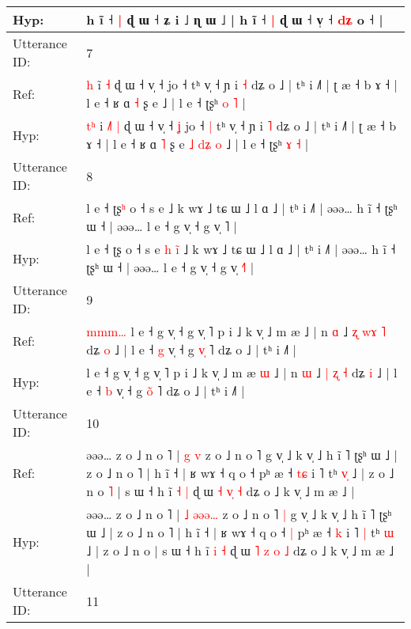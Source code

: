\documentclass[10pt]{article}
\DeclareRobustCommand{\hl}[1]{{\textcolor{red}{#1}}}
\begin{document}
\begin{longtable}{ll}
 \\
Hyp: & h ĩ ˧\hl{ }\hl{|} ɖ ɯ ˧ ʑ i ˩ ɳ ɯ ˩ | h ĩ ˧\hl{ }\hl{|} ɖ ɯ ˧ v̩ ˧ \hl{d}\hl{ʑ}\hl{ }o ˧ |
 \\
\midrule
Utterance ID: & 7 \\
Ref: & \hl{}\hl{h} i\hl{}\hl{}\hl{̃} \hl{˧} ɖ ɯ ˧ v̩ ˧\hl{}\hl{} jo ˧\hl{}\hl{} tʰ v̩ ˧ ɲ i \hl{˧} dʑ o ˩ | tʰ i ˩˥ | ʈ æ ˧ b ɤ ˧ | l e ˧ ʁ ɑ \hl{˧} ʂ e\hl{}\hl{}\hl{}\hl{}\hl{}\hl{}\hl{} ˩ | l e ˧ ʈʂʰ \hl{o} \hl{˥} |
 \\
Hyp: & \hl{t}\hl{ʰ} i\hl{ }\hl{˩}\hl{˥} \hl{|} ɖ ɯ ˧ v̩ ˧\hl{ }\hl{ʝ} jo ˧\hl{ }\hl{|} tʰ v̩ ˧ ɲ i \hl{˥} dʑ o ˩ | tʰ i ˩˥ | ʈ æ ˧ b ɤ ˧ | l e ˧ ʁ ɑ \hl{˥} ʂ e\hl{ }\hl{˩}\hl{ }\hl{d}\hl{ʑ}\hl{ }\hl{o} ˩ | l e ˧ ʈʂʰ \hl{ɤ} \hl{˧} |
 \\
\midrule
Utterance ID: & 8 \\
Ref: & l e ˧ ʈʂ\hl{ʰ} o ˧ s e\hl{}\hl{}\hl{}\hl{}\hl{} ˩ k wɤ ˩ tɕ ɯ ˩ l ɑ ˩ | tʰ i ˩˥ | əəə… h ĩ ˧ ʈʂʰ ɯ ˧ | əəə… l e ˧ g v̩ ˧ g v̩ \hl{}˥ |
 \\
Hyp: & l e ˧ ʈʂ\hl{} o ˧ s e\hl{ }\hl{h}\hl{ }\hl{i}\hl{̃} ˩ k wɤ ˩ tɕ ɯ ˩ l ɑ ˩ | tʰ i ˩˥ | əəə… h ĩ ˧ ʈʂʰ ɯ ˧ | əəə… l e ˧ g v̩ ˧ g v̩ \hl{˧}˥ |
 \\
\midrule
Utterance ID: & 9 \\
Ref: & \hl{m}\hl{m}\hl{m}\hl{…}\hl{ }l e ˧ g v̩ ˧ g v̩ ˥ p i ˩ k v̩ ˩ m æ\hl{}\hl{} ˩ | n \hl{ɑ} ˩ \hl{ʐ} \hl{w}\hl{ɤ} \hl{˥} dʑ \hl{o} ˩ | l e ˧ \hl{g} v̩ ˧ g \hl{v}\hl{̩} ˥ dʑ o ˩ | tʰ i ˩˥ |
 \\
Hyp: & \hl{}\hl{}\hl{}\hl{}\hl{}l e ˧ g v̩ ˧ g v̩ ˥ p i ˩ k v̩ ˩ m æ\hl{ }\hl{ɯ} ˩ | n \hl{ɯ} ˩ \hl{|} \hl{}\hl{ʐ} \hl{˧} dʑ \hl{i} ˩ | l e ˧ \hl{b} v̩ ˧ g \hl{o}\hl{̃} ˥ dʑ o ˩ | tʰ i ˩˥ |
 \\
\midrule
Utterance ID: & 10 \\
Ref: & əəə… z o ˩ n o ˥ | \hl{g} \hl{}\hl{}\hl{}\hl{v} z o ˩ n o ˥\hl{}\hl{} g v̩ ˩ k v̩ ˩ h ĩ ˥ ʈʂʰ ɯ ˩ | z o ˩ n o ˥ | h ĩ ˧ | ʁ wɤ ˧ q o ˧\hl{}\hl{} pʰ æ ˧ \hl{t}\hl{ɕ} i ˥\hl{}\hl{} tʰ \hl{v}\hl{̩} ˩ | z o ˩ n o\hl{ }\hl{˥} | s ɯ ˧ h ĩ \hl{˧} \hl{|} ɖ ɯ \hl{˧} \hl{}\hl{v}\hl{̩} \hl{˧} dʑ o ˩ k v̩ ˩ m æ ˩ |
 \\
Hyp: & əəə… z o ˩ n o ˥ | \hl{˩} \hl{ə}\hl{ə}\hl{ə}\hl{…} z o ˩ n o ˥\hl{ }\hl{|} g v̩ ˩ k v̩ ˩ h ĩ ˥ ʈʂʰ ɯ ˩ | z o ˩ n o ˥ | h ĩ ˧ | ʁ wɤ ˧ q o ˧\hl{ }\hl{|} pʰ æ ˧ \hl{}\hl{k} i ˥\hl{ }\hl{|} tʰ \hl{}\hl{ɯ} ˩ | z o ˩ n o\hl{}\hl{} | s ɯ ˧ h ĩ \hl{i} \hl{˧} ɖ ɯ \hl{˥} \hl{z}\hl{ }\hl{o} \hl{˩} dʑ o ˩ k v̩ ˩ m æ ˩ |
 \\
\midrule
Utterance ID: & 11 \\

\end{longtable}
\end{document}
